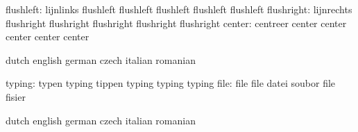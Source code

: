                 flushleft: lijnlinks                 flushleft
                           flushleft                 flushleft
                           flushleft                 flushleft
               flushright: lijnrechts                flushright
                           flushright                flushright
                           flushright                flushright
                   center: centreer                  center
                           center                    center
                           center                    center

\stopvariables

\startvariables            dutch                     english
                           german                    czech
                           italian                   romanian

                   typing: typen                     typing
                           tippen                    typing
                           typing                    typing %
                     file: file                      file
                           datei                     soubor
                           file                      fisier

\stopvariables




\startvariables            dutch                     english
                           german                    czech
                           italian                   romanian

